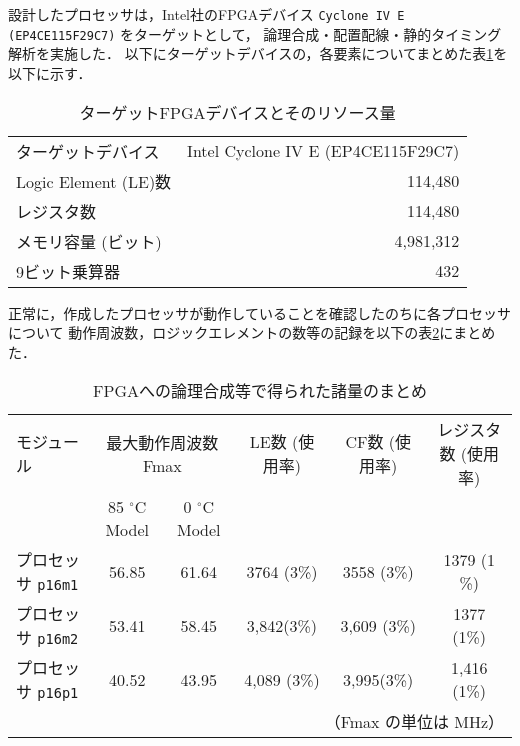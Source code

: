 \documentclass[autodetect-engine,dvi=dvipdfmx,ja=standard,
               a4j,11pt]{bxjsarticle}
\begin{document}
設計したプロセッサは，Intel社のFPGAデバイス \texttt{Cyclone IV E (EP4CE115F29C7)} をターゲットとして，
論理合成・配置配線・静的タイミング解析を実施した．
以下にターゲットデバイスの，各要素についてまとめた表\ref{tab:ターゲットFPGAデバイスとそのリソース量}を以下に示す．\\
\begin{table}[hbtp]
    \caption{ターゲットFPGAデバイスとそのリソース量}
    \label{tab:ターゲットFPGAデバイスとそのリソース量}
    \begin{center}
    \begin{tabular}{l|r}
    \hline \hline
    ターゲットデバイス & Intel Cyclone IV E (EP4CE115F29C7) \\
    Logic Element (LE)数 & 114,480 \\
    レジスタ数 & 114,480 \\
    メモリ容量 (ビット) & 4,981,312\\
    9ビット乗算器 & 432 \\
    \hline
    \end{tabular}
    \end{center}
    \end{table}

正常に，作成したプロセッサが動作していることを確認したのちに各プロセッサについて
動作周波数，ロジックエレメントの数等の記録を以下の表\ref{tab:FPGAへの論理合成等で得られた諸量のまとめ}にまとめた．\\
\begin{table}[hbtp]
    \caption{FPGAへの論理合成等で得られた諸量のまとめ}
    \label{tab:FPGAへの論理合成等で得られた諸量のまとめ}
    \begin{center}
    {\small
    \begin{tabular}{l|ccccc}
    \hline
    \hline
    モジュール &
    \multicolumn{2}{c}{最大動作周波数 Fmax} & LE数 (使用率) & 
    CF数 (使用率) & レジスタ数 (使用率)  \\
    & 85 $^\circ$C Model & 0 $^\circ$C Model & & &  \\
    \hline
    プロセッサ \verb|p16m1| & 56.85& 61.64& 3764 (3\%) & 3558 (3\%)&  1379 (1 \%) \\
    プロセッサ \verb|p16m2| & 53.41& 58.45& 3,842(3\%)& 3,609 (3\%)&  1377 (1\%)\\
    プロセッサ \verb|p16p1| & 40.52& 43.95& 4,089 (3\%)& 3,995(3\%) & 1,416 (1\%)\\
    \hline
    \multicolumn{6}{r}{（Fmax の単位は MHz）}
    \end{tabular}
    }
    \end{center}
    \end{table}
\end{document}
